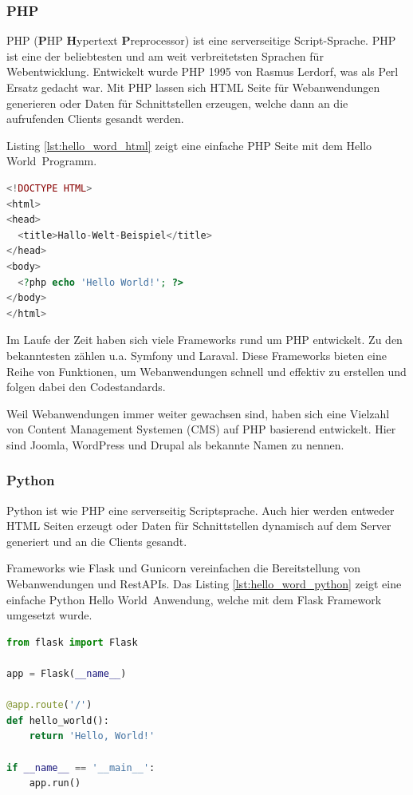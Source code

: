 \subsubsection{PHP}
PHP (\textbf{P}HP \textbf{H}ypertext \textbf{P}reprocessor) ist eine serverseitige Script-Sprache. PHP ist eine der beliebtesten und am weit verbreitetsten Sprachen für Webentwicklung. Entwickelt wurde PHP 1995 von Rasmus Lerdorf, was als Perl Ersatz gedacht war. Mit PHP lassen sich HTML Seite für Webanwendungen generieren oder Daten für Schnittstellen erzeugen, welche dann an die aufrufenden Clients gesandt werden.\vspace{0.2cm}

Listing \ref{lst:hello_word_html} zeigt eine einfache PHP Seite mit dem \glqq Hello World\grqq \ Programm.

\begin{lstlisting}[language=PHP,label=lst:hello_word_html,caption={Hello World in HTML}]
<!DOCTYPE HTML>
<html>
<head>
  <title>Hallo-Welt-Beispiel</title>
</head>
<body>
  <?php echo 'Hello World!'; ?>
</body>
</html>
\end{lstlisting}

Im Laufe der Zeit haben sich viele Frameworks rund um PHP entwickelt. Zu den bekanntesten zählen u.a. Symfony und Laraval. Diese Frameworks bieten eine Reihe von Funktionen, um Webanwendungen schnell und effektiv zu erstellen und folgen dabei den Codestandards.\vspace{0.2cm}

Weil Webanwendungen immer weiter gewachsen sind, haben sich eine Vielzahl von Content Management Systemen (CMS) auf PHP basierend entwickelt. Hier sind Joomla, WordPress und Drupal als bekannte Namen zu nennen.


\subsubsection{Python}
Python ist wie PHP eine serverseitig Scriptsprache. Auch hier werden entweder HTML Seiten erzeugt oder Daten für Schnittstellen dynamisch auf dem Server generiert und an die Clients gesandt.\vspace{0.2cm}

Frameworks wie Flask und Gunicorn vereinfachen die Bereitstellung von Webanwendungen und RestAPIs. Das Listing \ref{lst:hello_word_python} zeigt eine einfache Python \glqq Hello World\grqq \ Anwendung, welche mit dem Flask Framework umgesetzt wurde.

\begin{lstlisting}[language=Python,label=lst:hello_word_python,caption={Hello World in Python}]
from flask import Flask

app = Flask(__name__)

@app.route('/')
def hello_world():
    return 'Hello, World!'

if __name__ == '__main__':
    app.run()
\end{lstlisting}


